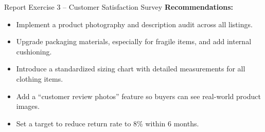 \documentclass[12pt,a4paper]{article}
\begin{document}
\begin{exbox}{Report Exercise 3 -- Customer Satisfaction Survey}
\textbf{Recommendations:}
\begin{itemize}[noitemsep]
    \item Implement a product photography and description audit across all listings.
    \item Upgrade packaging materials, especially for fragile items, and add internal cushioning.
    \item Introduce a standardized sizing chart with detailed measurements for all clothing items.
    \item Add a ``customer review photos'' feature so buyers can see real-world product images.
    \item Set a target to reduce return rate to 8\% within 6 months.
\end{itemize}
\end{exbox}
\end{document}
